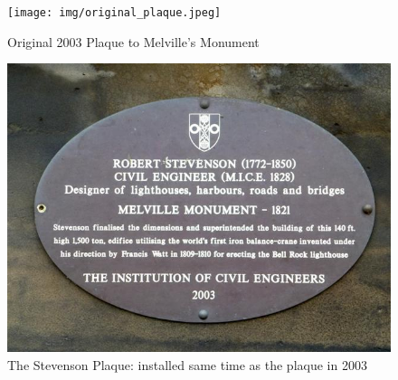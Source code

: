 \documentclass{scrartcl}
\begin{document}
\begin{appendices}
\begin{figure}
    \centering
    \texttt{[image: img/original\_plaque.jpeg]}
    \caption{Original 2003 Plaque to Melville's Monument}
    \label{fig:original_plaque}
\end{figure}

\begin{figure}
    \centering
    \includegraphics[width=1\linewidth]{img/stevenson_plaque.jpg}
    \caption{The Stevenson Plaque: installed same time as the plaque in 2003}
    \label{fig:stevenson_plaque}
\end{figure}
\begin{figure}
    \centering

\end{figure}
\end{appendices}
\end{document}
